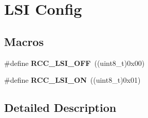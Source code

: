 \hypertarget{group___r_c_c___l_s_i___config}{}\section{L\+SI Config}
\label{group___r_c_c___l_s_i___config}
\subsection*{Macros}
\begin{DoxyCompactItemize}
\item 
\#define {\bfseries R\+C\+C\+\_\+\+L\+S\+I\+\_\+\+O\+FF}~((uint8\+\_\+t)0x00)\hypertarget{group___r_c_c___l_s_i___config_gaa1710927d79a2032f87f039c4a27356a}{}\label{group___r_c_c___l_s_i___config_gaa1710927d79a2032f87f039c4a27356a}

\item 
\#define {\bfseries R\+C\+C\+\_\+\+L\+S\+I\+\_\+\+ON}~((uint8\+\_\+t)0x01)\hypertarget{group___r_c_c___l_s_i___config_ga6b364ac3500e60b6bff695ee518c87d6}{}\label{group___r_c_c___l_s_i___config_ga6b364ac3500e60b6bff695ee518c87d6}

\end{DoxyCompactItemize}


\subsection{Detailed Description}
